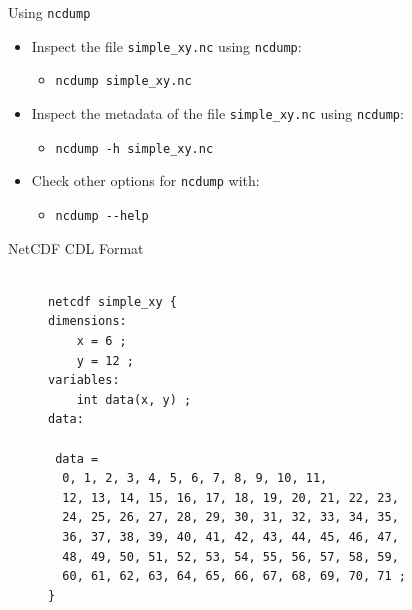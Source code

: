 \documentclass[compress,11pt,xcolor=svgnames,aspectratio=169]{beamer}
\begin{document}
\begin{frame}[fragile]{Using \texttt{ncdump}}

\begin{itemize}
\setlength\itemsep{0.5cm}

  \item Inspect the file \verb|simple_xy.nc| using \texttt{ncdump}:\\[0.4cm]

  \begin{itemize}
  \setlength\itemsep{0.5cm}

    \item \verb|ncdump simple_xy.nc|

  \end{itemize}

  \item Inspect the metadata of the file \verb|simple_xy.nc| using \texttt{ncdump}:\\[0.4cm]

  \begin{itemize}
  \setlength\itemsep{0.5cm}

    \item \verb|ncdump -h simple_xy.nc|

  \end{itemize}

  \item Check other options for \texttt{ncdump} with:\\[0.4cm]

  \begin{itemize}
  \setlength\itemsep{0.5cm}

    \item \verb|ncdump --help|

  \end{itemize}

\end{itemize}

\end{frame}

\begin{frame}[fragile]{NetCDF CDL Format}

\begin{figure}
\centering
\begin{varwidth}{\linewidth}
{\footnotesize

\begin{verbatim}

netcdf simple_xy {
dimensions:
	x = 6 ;
	y = 12 ;
variables:
	int data(x, y) ;
data:

 data =
  0, 1, 2, 3, 4, 5, 6, 7, 8, 9, 10, 11,
  12, 13, 14, 15, 16, 17, 18, 19, 20, 21, 22, 23,
  24, 25, 26, 27, 28, 29, 30, 31, 32, 33, 34, 35,
  36, 37, 38, 39, 40, 41, 42, 43, 44, 45, 46, 47,
  48, 49, 50, 51, 52, 53, 54, 55, 56, 57, 58, 59,
  60, 61, 62, 63, 64, 65, 66, 67, 68, 69, 70, 71 ;
}

\end{verbatim}

}
\end{varwidth}
\end{figure}

\end{frame}
\end{document}
